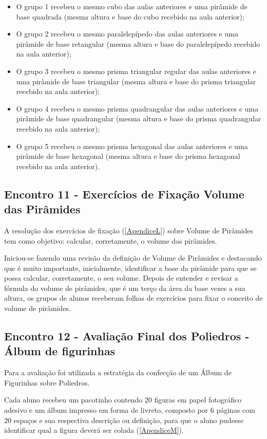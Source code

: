 \begin{itemize}
    \item O grupo 1 recebeu o mesmo cubo das aulas anteriores e uma pirâmide de base quadrada (mesma altura e base do cubo recebido na aula anterior);
    \item O grupo 2 recebeu o mesmo paralelepípedo das aulas anteriores e uma pirâmide de base retangular (mesma altura e base do paralelepípedo recebido na aula anterior);
    \item O grupo 3 recebeu o mesmo prisma triangular regular das aulas anteriores e uma pirâmide de base triangular (mesma altura e base do prisma triangular recebido na aula anterior);
    \item O grupo 4 recebeu o mesmo prisma quadrangular das aulas anteriores e uma pirâmide de base quadrangular (mesma altura e base do prisma quadrangular recebido na aula anterior);
    \item O grupo 5 recebeu o mesmo prisma hexagonal das aulas anteriores e uma pirâmide de base hexagonal (mesma altura e base do prisma hexagonal recebido na aula anterior).
\end{itemize}

\subsection{Encontro 11 - Exercícios de Fixação Volume das Pirâmides}

A resolução dos exercícios de fixação (\autoref{ApendiceL}) sobre Volume de Pirâmides tem como objetivo: calcular, corretamente, o volume das pirâmides.

Iniciou-se fazendo uma revisão da definição de Volume de Pirâmides e destacando que é muito importante, inicialmente, identificar a base da pirâmide para que se possa calcular, corretamente, o seu volume. Depois de entender e revisar a fórmula do volume de pirâmides, que é um terço da área da base vezes a sua altura, os grupos de alunos receberam folhas de exercícios para fixar o conceito de volume de pirâmides.

\subsection{Encontro 12 - Avaliação Final dos Poliedros - Álbum de figurinhas}

Para a avaliação foi utilizada a estratégia da confecção de um Álbum de Figurinhas sobre Poliedros.

Cada aluno recebeu um pacotinho contendo 20 figuras em papel fotográfico adesivo e um álbum impresso em forma de livreto, composto por 6 páginas com 20 espaços e sua respectiva descrição ou definição, para que o aluno pudesse identificar qual a figura deverá ser colada (\autoref{ApendiceM}).

